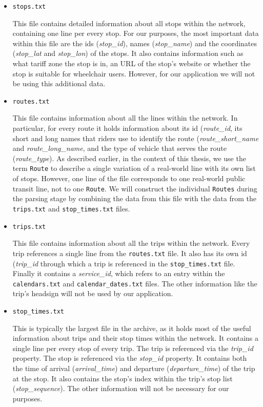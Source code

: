 \begin{itemize}
    \item \texttt{stops.txt}
    
    This file contains detailed information about all stops within the network, containing one line per every stop. For our purposes, the most important data within this file are the ids (\textit{stop\_id}), names (\textit{stop\_name}) and the coordinates (\textit{stop\_lat} and \textit{stop\_lon}) of the stops. It also contains information such as what tariff zone the stop is in, an URL of the stop's website or whether the stop is suitable for wheelchair users. However, for our application we will not be using this additional data.

    \item \texttt{routes.txt}

    This file contains information about all the lines within the network. In particular, for every route it holds information about its id (\textit{route\_id}, its short and long names that riders use to identify the route (\textit{route\_short\_name} and \textit{route\_long\_name}, and the type of vehicle that serves the route (\textit{route\_type}). As described earlier, in the context of this thesis, we use the term \texttt{Route} to describe a single variation of a real-world line with its own list of stops. However, one line of the file corresponds to one real-world public transit line, not to one \texttt{Route}. We will construct the individual \texttt{Routes} during the parsing stage by combining the data from this file with the data from the \texttt{trips.txt} and \texttt{stop\_times.txt} files.

    \item \texttt{trips.txt}

    This file contains information about all the trips within the network. Every trip references a single line from the \texttt{routes.txt} file. It also has its own id (\textit{trip\_id} through which a trip is referenced in the \texttt{stop\_times.txt} file. Finally it contains a \textit{service\_id}, which refers to an entry within the \texttt{calendars.txt} and \texttt{calendar\_dates.txt} files. The other information like the trip's headsign will not be used by our application.

    \item \texttt{stop\_times.txt}

    This is typically the largest file in the archive, as it holds most of the useful information about trips and their stop times within the network. It contains a single line per every stop of every trip. The trip is referenced via the \textit{trip\_id} property. The stop is referenced via the \textit{stop\_id} property. It contains both the time of arrival (\textit{arrival\_time}) and departure (\textit{departure\_time}) of the trip at the stop. It also contains the stop's index within the trip's stop list (\textit{stop\_sequence}). The other information will not be necessary for our purposes.


\end{itemize}

